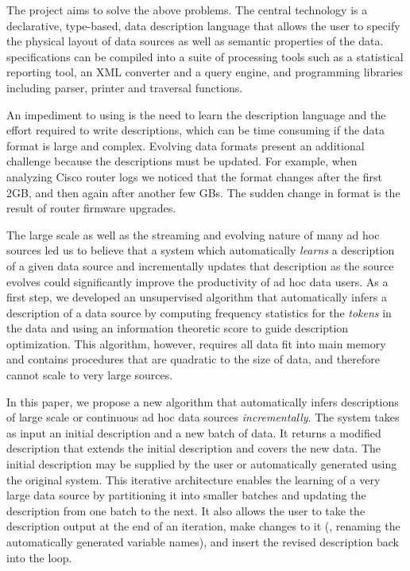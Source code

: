 The \pads{}
project \cite{padsweb} aims to solve the above 
problems. The central technology is a declarative, type-based, 
data description language that allows the user to specify the physical
layout of data sources as well as semantic properties of the data. 
\pads{} specifications can be compiled into a suite of
processing tools such as a statistical reporting tool, an 
XML converter and a query engine, and programming libraries 
including parser, printer and traversal functions. 

An impediment to using \pads{} is the need to learn
the description language and the effort required to
write \pads{} descriptions, which can be time consuming
if the data format is large and complex. Evolving data formats 
present an additional challenge because the descriptions must be updated.
For example, when analyzing Cisco router
logs we noticed that the format changes after the first 2GB, 
and then again after another few GBs. The sudden change in format is
the result of router firmware upgrades.

The large scale as well as the streaming and evolving nature of many ad hoc
sources led us to believe that a system which automatically {\em learns}
a \pads{} description of a given data source and incrementally updates that
description as the source evolves could significantly improve the productivity of ad hoc data users.
As a first step, we developed an unsupervised algorithm \learnpads{}
\cite{Fisher+:dirttoshovels,fisher+:sigmod08}
that automatically infers a \pads{} description of a data source by 
computing frequency statistics for the {\em tokens} in the data and using an information
theoretic score to guide description optimization.  
This algorithm, however,
requires all data fit into main memory and contains procedures 
that are quadratic to the size of data, 
and therefore cannot scale to very large sources. 

In this paper, we propose a new algorithm that automatically infers 
descriptions of large scale or continuous ad hoc data sources 
{\em incrementally}. The system takes as input an initial description 
and a new batch of data. It returns a
modified description that extends the initial description and covers the new 
data. The initial description may be supplied by the user or automatically
generated using the original \learnpads{} system. This iterative architecture
enables the learning of a very large data source by partitioning it 
into smaller batches and updating the description from one batch to the next. 
It also allows the user to take the description output at the end of
an iteration, make changes to it (\eg{}, renaming the 
automatically generated variable names), and insert the revised description back into the loop.


